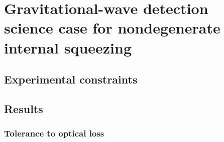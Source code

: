 \chapter{Gravitational-wave detection science case for nondegenerate internal squeezing}
\label{chp:science_case}

\section{Experimental constraints} %








\section{Results}


\begin{figure}
	\centering
	\caption{}
	\label{fig:}
\end{figure}

\subsection{Tolerance to optical loss}


